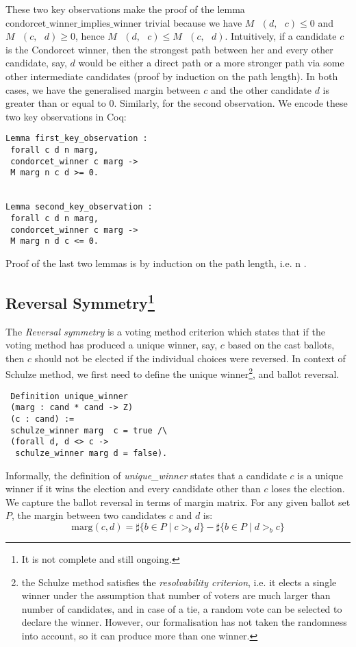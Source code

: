 \documentclass[compsoc,conference,a4paper,10pt,times]{IEEEtran}
\begin{document}
 
 These two key observations make the proof of the lemma
 $\mathrm{condorcet\_winner\_implies\_winner}$  
 trivial because we have $M \text{ } (d, \text{ }c) \leq 0$  and
  $M \text{ } (c, \text{ }d) \geq 0$, hence $M \text{ } (d, \text{ }c)  \leq 
   M \text{ } (c, \text{ }d)$. Intuitively, 
 if a candidate $c$ is the Condorcet winner, then the strongest path between her and every other 
 candidate, say, $d$ would be either a direct path or a more stronger path 
 via some other intermediate candidates (proof by induction on the path length). 
 In both cases, we have the generalised margin between 
 $c$ and the other candidate $d$ is greater than or equal to 0. 
 Similarly, for the second observation. We encode these two key observations in 
 Coq:
 
 \begin{verbatim}
Lemma first_key_observation : 
 forall c d n marg, 
 condorcet_winner c marg -> 
 M marg n c d >= 0.


Lemma second_key_observation : 
 forall c d n marg, 
 condorcet_winner c marg -> 
 M marg n d c <= 0.

 \end{verbatim}

Proof of the last two lemmas is by induction on the path length, i.e. n \cite{Carre:1971:ANR}. 







\subsection{Reversal Symmetry\footnote{It is not complete and still ongoing.}}
 The \textit{Reversal symmetry} is a voting method criterion which states that if the
 voting method has produced a unique 
  winner, say, $c$ based on the cast ballots, then $c$ should not be elected if the 
 individual choices were reversed. 
 In context of Schulze method, we first need to define the unique winner\footnote{
 the Schulze method satisfies the 
 \textit{resolvability criterion}, i.e. it elects a single winner under the 
 assumption that number of voters are much larger than
 number of candidates, and in case of a tie,
 a random vote can be selected to declare the winner.  However, our 
 formalisation has not taken the randomness into account, so it can 
 produce more than one winner.}, and ballot reversal. 
 
 \begin{verbatim}
 Definition unique_winner 
 (marg : cand * cand -> Z) 
 (c : cand) :=
 schulze_winner marg  c = true /\
 (forall d, d <> c -> 
  schulze_winner marg d = false).
\end{verbatim}  
\noindent
Informally, the definition of \textit{unique\_winner} states that a 
candidate $c$ is a unique winner
if it wins the election and every candidate 
other than $c$ loses the election.
We capture the ballot reversal in terms of margin matrix. For any given ballot set $P$, 
the margin between two candidates $c$ and $d$ is: 
\[
  \mathrm{marg}(c, d) = \sharp \lbrace b \in P \mid c >_b d \rbrace -
            \sharp \lbrace b \in P \mid d >_b c \rbrace
\] 
\end{document}
